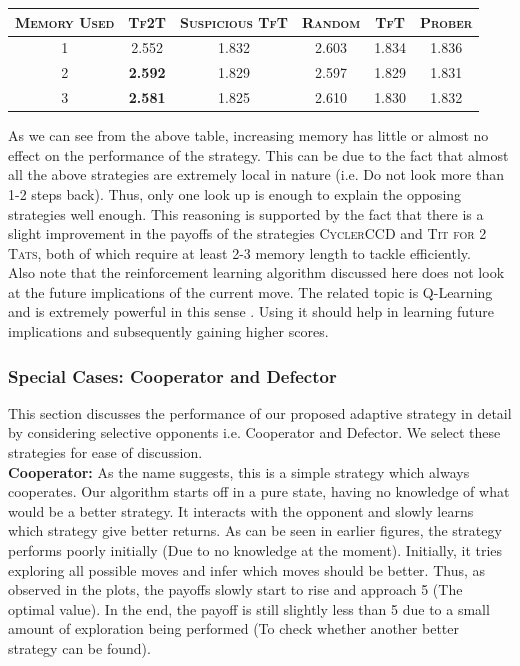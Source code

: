 \documentclass[a4paper]{article}
\begin{document}
	\begin{table}[H]
	  \begin{center}
	    \begin{tabular}{|c|c|c|c|c|c|}
	      \toprule
	 	  \textsc{Memory Used} & \textsc{Tf2T} & {\footnotesize{\textsc{Suspicious TfT}}} & \textsc{Random} & \textsc{TfT} & \textsc{Prober}\\
	      \midrule
		  1	& 2.552 & 1.832 & 2.603 & 1.834 & 1.836\\
		  2 & \textbf{2.592} & 1.829 & 2.597 & 1.829 & 1.831\\
		  3 & \textbf{2.581} & 1.825 & 2.610 & 1.830 & 1.832\\
		\bottomrule
	    \end{tabular}
	  \end{center}
	\end{table}  		
	 
	\vspace{-5mm}	

	As we can see from the above table, increasing memory has little or almost no effect on the performance of the strategy. This can be due to the fact that almost all the above strategies are extremely local in nature (i.e. Do not look more than 1-2 steps back). Thus, only one look up is enough to explain the opposing strategies well enough. This reasoning is supported by the fact that there is a slight improvement in the payoffs of the strategies  \textsc{CyclerCCD} and \textsc{Tit for 2 Tats}, both of which require at least 2-3 memory length to tackle efficiently.\\
	
	Also note that the reinforcement learning algorithm discussed here does not look at the future implications of the current move. The related topic is Q-Learning and is extremely powerful in this sense \cite{qlearn}. Using it should help in learning future implications and subsequently gaining higher scores.
	 
	\subsubsection{Special Cases: Cooperator and Defector}

	This section discusses the performance of our proposed adaptive strategy in detail by considering selective opponents i.e. Cooperator and Defector. We select these strategies for ease of discussion.\\
	
	\noindent
	\textbf{Cooperator: } As the name suggests, this is a simple strategy which always cooperates. Our algorithm starts off in a pure state, having no knowledge of what would be a better strategy. It interacts with the opponent and slowly learns which strategy give better returns. As can be seen in earlier figures, the strategy performs poorly initially (Due to no knowledge at the moment). Initially, it tries exploring all possible moves and infer which moves should be better. Thus, as observed in the plots, the payoffs slowly start to rise and approach 5 (The optimal value). In the end, the payoff is still slightly less than 5 due to a small amount of exploration being performed (To check whether another better strategy can be found).\\
	
\end{document}
